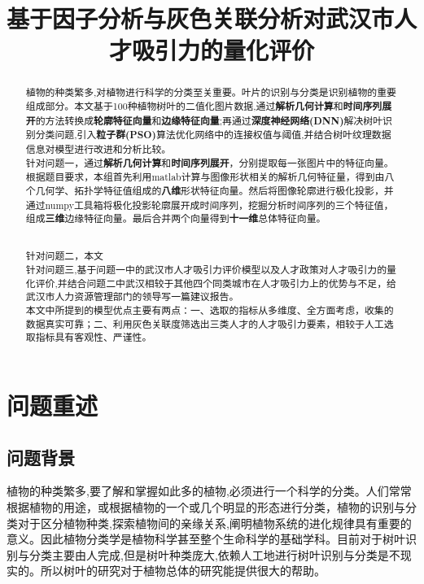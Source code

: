 \documentclass{whutmod}
\title{基于因子分析与灰色关联分析对武汉市人才吸引力的量化评价}
\begin{document}
	
	\begin{abstract}

植物的种类繁多,对植物进行科学的分类至关重要。叶片的识别与分类是识别植物的重要组成部分。本文基于100种植物树叶的二值化图片数据,通过\textbf{解析几何计算}和\textbf{时间序列展开}的方法转换成\textbf{轮廓特征向量}和\textbf{边缘特征向量};再通过\textbf{深度神经网络(DNN)}解决树叶识别分类问题,引入\textbf{粒子群(PSO)}算法优化网络中的连接权值与阈值,并结合树叶纹理数据信息对模型进行改进和分析比较。
~\\



针对问题一，通过\textbf{解析几何计算}和\textbf{时间序列展开}，分别提取每一张图片中的特征向量。根据题目要求，本组首先利用matlab计算与图像形状相关的解析几何特征量，得到由八个几何学、拓扑学特征值组成的\textbf{八维}形状特征向量。然后将图像轮廓进行极化投影，并通过numpy工具箱将极化投影轮廓展开成时间序列，挖掘分析时间序列的三个特征值，组成\textbf{三维}边缘特征向量。最后合并两个向量得到\textbf{十一维}总体特征向量。


~\\

针对问题二，本文
~\\

针对问题三,基于问题一中的武汉市人才吸引力评价模型以及人才政策对人才吸引力的量化评价,并结合问题二中武汉相较于其他四个同类城市在人才吸引力上的优势与不足，给武汉市人力资源管理部门的领导写一篇建议报告。
~\\

本文中所提到的模型优点主要有两点：一、选取的指标从多维度、全方面考虑，收集的数据真实可靠；二、利用灰色关联度筛选出三类人才的人才吸引力要素，相较于人工选取指标具有客观性、严谨性。
  
		
	\end{abstract}
	
	\tableofcontents
	\newpage	%
	
	\section{问题重述}	
	\subsection{问题背景}
    植物的种类繁多,要了解和掌握如此多的植物,必须进行一个科学的分类。人们常常根据植物的用途，或根据植物的一个或几个明显的形态进行分类，植物的识别与分类对于区分植物种类,探索植物间的亲缘关系,阐明植物系统的进化规律具有重要的意义。因此植物分类学是植物科学甚至整个生命科学的基础学科。目前对于树叶识别与分类主要由人完成,但是树叶种类庞大,依赖人工地进行树叶识别与分类是不现实的。所以树叶的研究对于植物总体的研究能提供很大的帮助。
    
\end{document}
